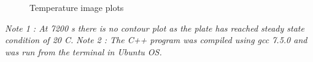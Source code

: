 \documentclass{article}
\begin{document}
\begin{figure}[H]
    \centering
	\vspace{-0.5cm}
    \centering
    \caption{Temperature image plots}
\end{figure}

\emph{Note 1 : At 7200 s there is no contour plot as the plate has reached steady state condition of 20 C.}\break
\emph{Note 2 : The C++ program was compiled using gcc 7.5.0 and was run from the terminal in Ubuntu OS.}
\end{document}
